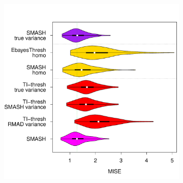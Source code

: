 \documentclass[12pt]{article}
\begin{document}
\begin{figure}
\begin{subfigure}[b]{0.3\textwidth}
        \caption{}
        \label{fig:gaus_hetero_sd_1}
    \end{subfigure}
		\hfill
    \begin{subfigure}[b]{0.65\textwidth}
        \centering
        \includegraphics[width=\textwidth]{violin_gaus_hetero_2.pdf}

\end{subfigure}
\end{figure}
\end{document}
